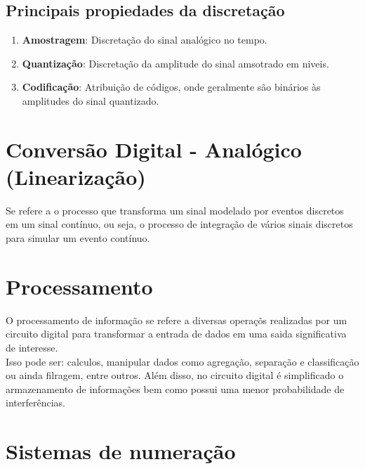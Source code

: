 \documentclass[12pt, onecolumn]{article}
\begin{document}
	\subsection{\centering Principais propiedades da discretação}	
	\begin{enumerate}
		\item\textbf{Amostragem}: Discretação do sinal analógico no tempo.
		\item\textbf{Quantização}: Discretação da amplitude 
			do sinal amsotrado em niveis.
		\item\textbf{Codificação}: Atribuição de códigos, onde geralmente 
				são binários às	amplitudes do sinal quantizado.
	\end{enumerate}

	\section{\centering Conversão Digital - Analógico (Linearização)}
	
	Se refere a o processo que transforma um sinal modelado por eventos 
	discretos em um sinal contínuo, ou seja, o processo de integração 
	de vários sinais discretos para simular um evento contínuo.

	\section{\centering Processamento}

	O processamento de informação se refere a diversas operaçõs 
	realizadas por um circuito digital para transformar a entrada 
	de dados em uma saida significativa de interesse.\\
	\newline
	Isso pode ser: calculos, manipular dados como agregação, 
	separação e classificação ou ainda filragem, entre outros. 
	Além disso, no circuito digital é simplificado o 
	armazenamento de informações bem como possui uma menor probabilidade 
	de interferências.
	
	\section{\centering Sistemas de numeração}
\end{document}
